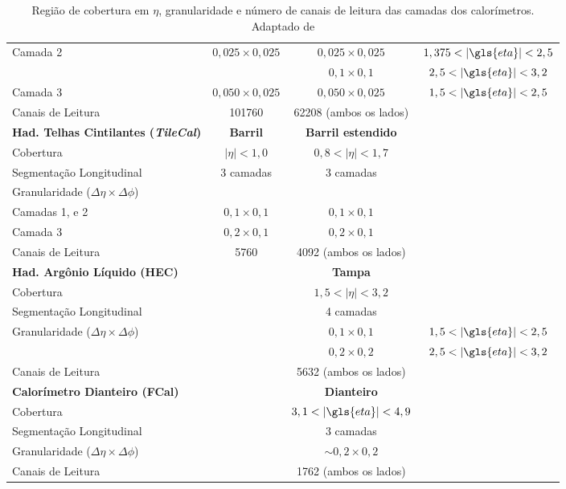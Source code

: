 \begin{table}[p]
{\begin{tabular}{p{5cm} c c c}
  Camada 2  & $0,025 \times 0,025$ & $0,025 \times 0,025$   & $1,375 <
|\gls{eta}| < 2,5$ \\
            &                      & $0,1 \times 0,1$      & $2,5   <
|\gls{eta}| < 3,2$ \\
  Camada 3  & $0,050 \times 0,025$ & $0,050 \times 0,025$  & $1,5   <
|\gls{eta}| < 2,5$ \\
  Canais de Leitura & 101760 & 62208 (ambos os lados)\\
   \hline
   \hline
  \textbf{Had. Telhas Cintilantes (\emph{TileCal})}    & \textbf{Barril}  & \textbf{Barril
estendido}     \\  \hline
  Cobertura   &  $|\eta|<1,0$ & $0,8<|\eta|<1,7$   \\
  Segmentação Longitudinal & 3 camadas  & 3 camadas  \\
  Granularidade ($\Delta \eta \times \Delta \phi$)& &  \\
  Camadas 1, e 2    &  $0,1 \times 0,1$ & $0,1 \times 0,1$   \\
  Camada 3   &  $0,2 \times 0,1$ & $0,2 \times 0,1$   \\
  Canais de Leitura & 5760 & 4092 (ambos os lados)\\
  \hline
  \hline
  \textbf{Had. Argônio Líquido (HEC)}    &  &  \textbf{Tampa}     \\  \hline
  Cobertura   &   & $1,5<|\eta|<3,2$  \\
  Segmentação Longitudinal &   & 4 camadas  \\
  Granularidade ($\Delta \eta \times \Delta \phi$)& & $0,1 \times 0,1 $ & $1,5 <
|\gls{eta}| < 2,5$ \\
  & & $0,2 \times 0,2 $ & $ 2,5 < |\gls{eta}| < 3,2$ \\
  Canais de Leitura & & 5632 (ambos os lados)\\
  \hline
  \hline
  \textbf{Calorímetro Dianteiro (FCal)}    &  &   \textbf{Dianteiro}    \\  \hline
  Cobertura   &  & $ 3,1 < |\gls{eta}| < 4,9 $ \\
  Segmentação Longitudinal &   & 3 camadas  \\
  Granularidade ($\Delta \eta \times \Delta \phi$)& & $\sim0,2 \times 0,2$  \\
  Canais de Leitura & & 1762 (ambos os lados)\\
  \hline
  \hline
\end{tabular}
}
\caption[Região de cobertura em $\eta$, granularidade e
número de canais de leitura das camadas dos calorímetros]
{Região de cobertura em $\eta$, granularidade e
número de canais de leitura das camadas dos calorímetros. Adaptado de
\cite{tese_eduardo}}
\vspace{.3cm}
\label{tab:calo}
\end{table}

